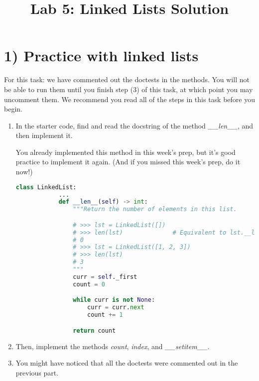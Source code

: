 \documentclass[12pt]{article}
\begin{document}
\title{Lab 5: Linked Lists Solution}
\date{}
\maketitle

\section*{1) Practice with linked lists}

For this task: we have commented out the doctests in the methods. You will not
be able to run them until you finish step (3) of this task, at which point you
may uncomment them. We recommend you read all of the steps in this task before
you begin.

\bigskip

\begin{enumerate}[1.]
    \item
    In the starter code, find and read the docstring of the method \textit{\_\_len\_\_},
    and then implement it.

    \bigskip

    You already implemented this method in this week’s prep, but it’s good practice
    to implement it again. (And if you missed this week’s prep, do it now!)

    \begin{mdframed}
        \begin{lstlisting}[language=python]
        class LinkedList:
            ...
            def __len__(self) -> int:
                """Return the number of elements in this list.

                # >>> lst = LinkedList([])
                # >>> len(lst)              # Equivalent to lst.__len__()
                # 0
                # >>> lst = LinkedList([1, 2, 3])
                # >>> len(lst)
                # 3
                """
                curr = self._first
                count = 0

                while curr is not None:
                    curr = curr.next
                    count += 1

                return count
        \end{lstlisting}
    \end{mdframed}

    \item Then, implement the methods \textit{count}, \textit{index}, and \textit{\_\_setitem\_\_}.

    \item You might have noticed that all the doctests were commented out in the previous part.


\end{enumerate}
\end{document}
